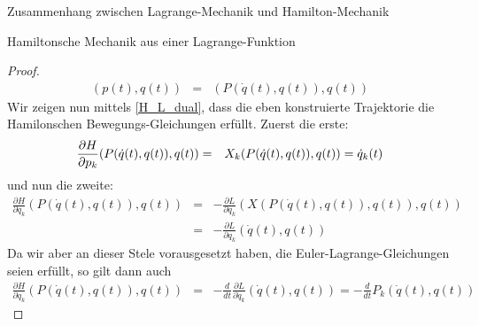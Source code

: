 \begin{chapter}{\titlestr}
\begin{appendix}
\begin{section}{Zusammenhang zwischen Lagrange-Mechanik und Hamilton-Mechanik}
\begin{subsection}{Hamiltonsche Mechanik aus einer Lagrange-Funktion}
\begin{proof}
\begin{eqnarray*}
(p(t),q(t)) &=& (P(\dot{q}(t),q(t)),q(t))
\end{eqnarray*}
Wir zeigen nun mittels \ref{H_L_dual}, dass die eben konstruierte Trajektorie die Hamilonschen Bewegungs-Gleichungen erfüllt.
Zuerst die erste:
\begin{eqnarray*}
\frac{\partial H}{\partial p_k}(P(\dot{q}(t),q(t)),q(t)) &=& X_k(P(\dot{q}(t),q(t)),q(t))=\dot{q}_k(t)\cr
\end{eqnarray*}
und nun die zweite:
\begin{eqnarray*}
\frac{\partial H}{\partial q_k}(P(\dot{q}(t),q(t)),q(t)) &=& -\frac{\partial L}{\partial q_k}(X(P(\dot{q}(t),q(t)),q(t)),q(t))\\
&=& -\frac{\partial L}{\partial q_k}(\dot{q}(t),q(t))
\end{eqnarray*}
Da wir aber an dieser Stele vorausgesetzt haben, die Euler-Lagrange-Gleichungen seien erfüllt, so gilt dann auch
\begin{eqnarray*}
\frac{\partial H}{\partial q_k}(P(\dot{q}(t),q(t)),q(t)) &=& -\frac{d}{dt}\frac{\partial L}{\partial \dot{q}_k}(\dot{q}(t),q(t))
=-\frac{d}{dt}P_k(\dot{q}(t),q(t))
\end{eqnarray*}
\end{proof}
\end{subsection}


\end{section}
\end{appendix}
\end{chapter}
